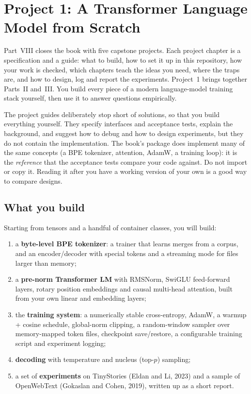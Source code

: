 \chapter{Project 1: A Transformer Language Model from Scratch}\label{ch:proj1}

Part~VIII closes the book with five capstone projects. Each project chapter is a specification
and a guide: what to build, how to set it up in this repository, how your work is checked, which
chapters teach the ideas you need, where the traps are, and how to design, log and report the
experiments. Project~1 brings together Parts~II and~III. You build every piece of a modern
language-model training stack yourself, then use it to answer questions empirically.

\begin{keyidea}
The project guides deliberately stop short of solutions, so that you build everything yourself.
They specify interfaces and acceptance tests, explain the background, and suggest how to debug
and how to design experiments, but they do not contain the implementation. The book's
 package does implement many of the same concepts (a BPE tokenizer, attention, AdamW,
a training loop): it is the \emph{reference} that the acceptance tests compare your code against.
Do not import or copy it. Reading it after you have a working version of your own is a good way
to compare designs.
\end{keyidea}

\section{What you build}\label{sec:proj1:overview}

Starting from tensors and a handful of container classes, you will build:

\begin{enumerate}
  \item a \textbf{byte-level BPE tokenizer}: a trainer that learns merges from a corpus, and an
        encoder/decoder with special tokens and a streaming mode for files larger than memory;
  \item a \textbf{pre-norm Transformer LM} with RMSNorm, SwiGLU feed-forward layers, rotary
        position embeddings and causal multi-head attention, built from your own linear and
        embedding layers;
  \item the \textbf{training system}: a numerically stable cross-entropy, AdamW, a warmup + cosine
        schedule, global-norm clipping, a random-window sampler over memory-mapped token files,
        checkpoint save/restore, a configurable training script and experiment logging;
  \item \textbf{decoding} with temperature and nucleus (top-$p$) sampling;
  \item a set of \textbf{experiments} on TinyStories (Eldan and Li, 2023) and a sample of
        OpenWebText (Gokaslan and Cohen, 2019), written up as a short report.
\end{enumerate}

